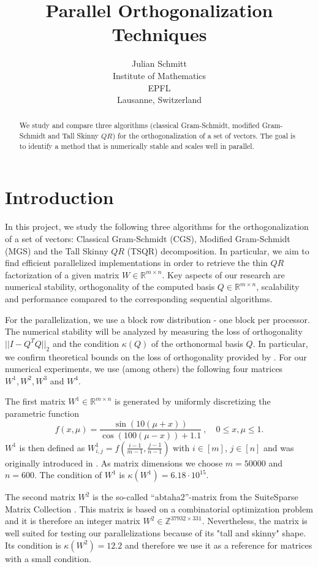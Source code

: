 \documentclass{article}
\title{Parallel Orthogonalization Techniques}
\author{%
  Julian Schmitt \\
  Institute of Mathematics \\
  EPFL \\
  Lausanne, Switzerland
}
\begin{document}
\maketitle


\begin{abstract}
    We study and compare three algorithms (classical Gram-Schmidt, modified
    Gram-Schmidt and Tall Skinny $QR$) for the orthogonalization of a set of
    vectors. The goal is to identify a method that is numerically stable and
    scales well in parallel.
\end{abstract}


\section{Introduction}
In this project, we study the following three algorithms for the
orthogonalization of a set of vectors: Classical Gram-Schmidt (CGS), Modified
Gram-Schmidt (MGS) and the Tall Skinny $QR$ (TSQR) decomposition. In particular,
we aim to find efficient parallelized implementations in order to retrieve the
thin $QR$ factorization of a given matrix $W \in \mathbb{R}^{m \times n}$. Key
aspects of our research are numerical stability, orthogonality of the computed
basis $Q \in \mathbb{R}^{m \times n}$, scalability and performance compared to
the corresponding sequential algorithms.

For the parallelization, we use a block row distribution - one block per
processor. The numerical stability will be analyzed by measuring the loss of
orthogonality $||I - Q^T Q||_2$ and the condition $\kappa(Q)$ of the
orthonormal basis $Q$. In particular, we confirm theoretical bounds on the loss
of orthogonality provided by \cite{Grigori:2023}. For our numerical experiments,
we use (among others) the following four matrices $W^1, W^2, W^3$ and $W^4$.

The first matrix $W^1 \in \mathbb{R}^{m \times n}$ is generated by uniformly
discretizing the parametric function
\begin{equation*}
    f(x, \mu) = \frac{\sin (10 (\mu + x))}{\cos (100 (\mu - x)) + 1.1} \ ,
    \quad 0 \leq x, \mu \leq 1.
\end{equation*}
$W^1$ is then defined as $W_{i,j}^1 = f(\frac{i - 1}{m - 1}, \frac{j - 1}{n -
1})$ with $i \in [m]$, $j \in [n]$ and was originally introduced in
\cite{BalabanovGrigori:2022}. As matrix dimensions we choose $m = 50000$ and $n
= 600$. The condition of $W^1$ is $\kappa(W^1) = 6.18\cdot10^{15}$.

The second matrix $W^2$ is the so-called \enquote{abtaha2}-matrix from the
SuiteSparse Matrix Collection \cite{DavisHu:2011}. This matrix is based on a
combinatorial optimization problem and it is therefore an integer matrix $W^2
\in \mathbb{Z}^{37932 \times 331}$. Nevertheless, the matrix is well suited for
testing our parallelizations because of its "tall and skinny" shape. Its
condition is $\kappa(W^2) = 12.2$ and therefore we use it as a reference for
matrices with a small condition.
\end{document}
